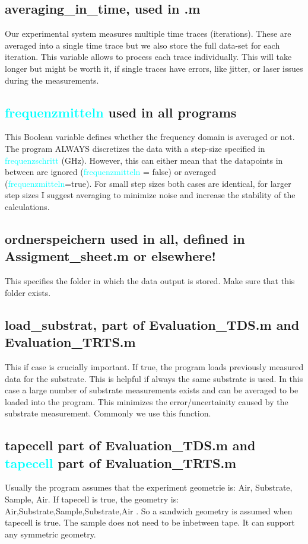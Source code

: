 \documentclass[12pt]{article}
\begin{document}
\subsection{averaging\_in\_time, used in \Pellet.m}
Our experimental system measures multiple time traces (iterations). These are averaged into a single time trace but we also store the full data-set for each iteration. This variable allows to process each trace individually. This will take longer but might be worth it, if single traces have errors, like jitter, or laser issues during the measurements. 
\subsection{\textcolor{cyan}{frequenzmitteln} used in all programs}
This Boolean variable defines whether the frequency domain is averaged or not. The program ALWAYS discretizes the data with a step-size specified in \textcolor{cyan}{ frequenzschritt} (GHz). However, this can either mean that the datapoints in between are ignored (\textcolor{cyan}{frequenzmitteln} = false) or averaged (\textcolor{cyan}{frequenzmitteln}=true). For small step sizes both cases are identical, for larger step sizes I suggest averaging to minimize noise and increase the stability of the calculations. 
\subsection{ordnerspeichern used in all, defined in Assigment\_sheet.m or elsewhere!}
This specifies the folder in which the data output is stored. Make sure that this folder exists. 

\subsection{load\_substrat, part of Evaluation\_TDS.m and Evaluation\_TRTS.m}
This if case is crucially important. If true, the program loads previously measured data for the substrate. This is helpful if always the same substrate is used. In this case a large number of substrate measurements exists and can be averaged to be loaded into the program. This minimizes the error/uncertainity caused by the substrate measurement. Commonly we use this function. 

\subsection{tapecell part of Evaluation\_TDS.m and \textcolor{cyan}{tapecell} part of Evaluation\_TRTS.m }
Usually the program assumes that the experiment geometrie is: Air, Substrate, Sample, Air.
If tapecell is true, the geometry is: Air,Substrate,Sample,Substrate,Air . So a sandwich geometry is assumed when tapecell is true. 
The sample does not need to be inbetween tape. It can support any symmetric geometry. 
\end{document}
